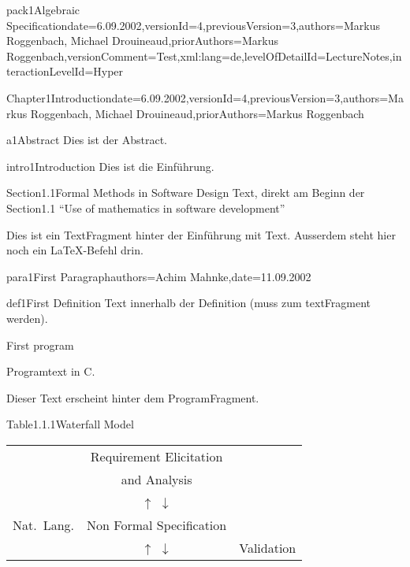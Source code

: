 \documentclass[landscape, slides, light]{mmiss2}
\begin{document}
\begin{Package}{pack1}{Algebraic
Specification}{date=6.09.2002,versionId=4,previousVersion=3,authors={Markus
Roggenbach, Michael Drouineaud},priorAuthors={Markus
Roggenbach},versionComment=Test,xml:lang=de,levelOfDetailId=LectureNotes,interactionLevelId=Hyper}


\begin{Section}{Chapter1}{Introduction}{date=6.09.2002,versionId=4,previousVersion=3,authors={Markus
Roggenbach, Michael Drouineaud},priorAuthors={Markus Roggenbach}}\begin{Abstract}[]{a1}{Abstract}{}
  Dies ist der Abstract.
  \end{Abstract}\begin{Introduction}[]{intro1}{Introduction}{}
    Dies ist die Einf\"uhrung.
  \end{Introduction}

  \begin{Section}{Section1.1}{Formal Methods in Software Design}{}
  Text, direkt am Beginn der Section1.1 
  ``Use of mathematics in software development''\\
  \begin{TextFragment}
  Dies ist ein TextFragment hinter der Einf\"uhrung mit
   Text. Ausserdem steht hier noch
  ein \LaTeX{}-Befehl drin.
  \end{TextFragment}
  \begin{Paragraph}[]{para1}{First Paragraph}{authors=Achim Mahnke,date=11.09.2002}
    \begin{Definition}[]{def1}{First Definition}{}
      Text innerhalb der Definition (muss zum textFragment werden).

      \begin{Program}[C]{}{First program}{}
        \begin{ProgramFragment}[]{}{}{}
          Programtext in C.
        \end{ProgramFragment}
        Dieser Text erscheint hinter dem ProgramFragment.
      \end{Program}
    \end{Definition}
  \end{Paragraph}
\end{Section}

\begin{Table}[LaTeX]{Table1.1.1}{Waterfall Model}{}
{\small
\begin{center}
\begin{tabular}{lcl}
               & Requirement Elicitation & \\ 
               & and Analysis            &\\
& $\uparrow$ $\downarrow$ &\\
Nat.~Lang.   & Non Formal Specification &\\
& $\uparrow$ $\downarrow$ & Validation \\


\end{tabular}
\end{center}}
\end{Table}
\end{Section}
\end{Package}
\end{document}
